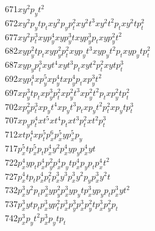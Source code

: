 \begin{tabbing}
671\>$x  y  ^2 p_yt  ^2 $\\
672\>$x  y  ^2 p_yt  p_t$\>$x  y  ^2 p_yp_t^2 $\>$x  y  ^2 t  ^3    $\>$x  y  ^2 t  ^2 p_t$\>$x  y  ^2 t  p_t^2 $\\
677\>$x  y  ^2 p_t^3    $\>$x  y  p_y^4       $\>$x  y  p_y^3 t     $\>$x  y  p_y^3 p_t   $\>$x  y  p_y^2 t  ^2 $\\
682\>$x  y  p_y^2 t  p_t$\>$x  y  p_y^2 p_t^2 $\>$x  y  p_yt  ^3    $\>$x  y  p_yt  ^2 p_t$\>$x  y  p_yt  p_t^2 $\\
687\>$x  y  p_yp_t^3    $\>$x  y  t  ^4       $\>$x  y  t  ^3 p_t   $\>$x  y  t  ^2 p_t^2 $\>$x  y  t  p_t^3    $\\
692\>$x  y  p_t^4       $\>$x  p_y^5          $\>$x  p_y^4 t        $\>$x  p_y^4 p_t      $\>$x  p_y^3 t  ^2    $\\
697\>$x  p_y^3 t  p_t   $\>$x  p_y^3 p_t^2    $\>$x  p_y^2 t  ^3    $\>$x  p_y^2 t  ^2 p_t$\>$x  p_y^2 t  p_t^2 $\\
702\>$x  p_y^2 p_t^3    $\>$x  p_yt  ^4       $\>$x  p_yt  ^3 p_t   $\>$x  p_yt  ^2 p_t^2 $\>$x  p_yt  p_t^3    $\\
707\>$x  p_yp_t^4       $\>$x  t  ^5          $\>$x  t  ^4 p_t      $\>$x  t  ^3 p_t^2    $\>$x  t  ^2 p_t^3    $\\
712\>$x  t  p_t^4       $\>$x  p_t^5          $\>$p_x^6             $\>$p_x^5 y           $\>$p_x^5 p_y         $\\
717\>$p_x^5 t           $\>$p_x^5 p_t         $\>$p_x^4 y  ^2       $\>$p_x^4 y  p_y      $\>$p_x^4 y  t        $\\
722\>$p_x^4 y  p_t      $\>$p_x^4 p_y^2       $\>$p_x^4 p_yt        $\>$p_x^4 p_yp_t      $\>$p_x^4 t  ^2       $\\
727\>$p_x^4 t  p_t      $\>$p_x^4 p_t^2       $\>$p_x^3 y  ^3       $\>$p_x^3 y  ^2 p_y   $\>$p_x^3 y  ^2 t     $\\
732\>$p_x^3 y  ^2 p_t   $\>$p_x^3 y  p_y^2    $\>$p_x^3 y  p_yt     $\>$p_x^3 y  p_yp_t   $\>$p_x^3 y  t  ^2    $\\
737\>$p_x^3 y  t  p_t   $\>$p_x^3 y  p_t^2    $\>$p_x^3 p_y^3       $\>$p_x^3 p_y^2 t     $\>$p_x^3 p_y^2 p_t   $\\
742\>$p_x^3 p_yt  ^2    $\>$p_x^3 p_yt  p_t   $\>

\end{tabbing}
